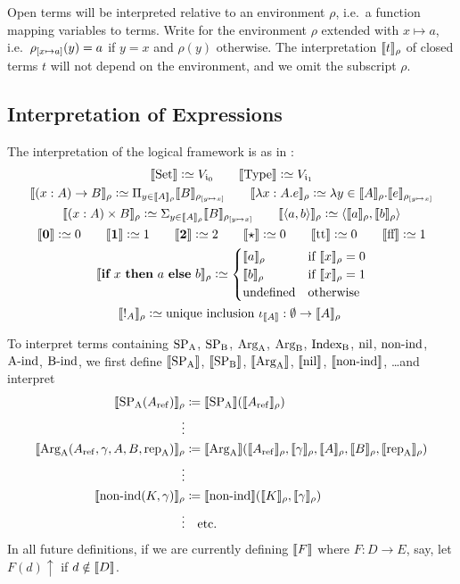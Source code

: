 \documentclass{article}
\begin{document}
Open terms will be interpreted relative to an environment $\rho$, i.e.\ a
function mapping variables to terms. Write  for the
environment $\rho$ extended with $x \mapsto a$, i.e.\ $\rhoextend{x}{a}(y) = a$
if $y = x$ and $\rho(y)$ otherwise. The interpretation $\sem{t}_{\rho}$ of closed
terms $t$ will not depend on the environment, and we omit the subscript $\rho$.

\subsection{Interpretation of Expressions}
\noindent 
The interpretation of the logical framework is as in
\cite{dybjersetzer1999finax}:
\begin{gather*}
\sem{\Set} \colonsimeq V_{\cardz} \qquad \sem{\TYPE} \colonsimeq V_{\cardi} \\
\sem{(x : A) \to B}_\rho \colonsimeq \Pi_{y \in
  \sem{A}_\rho}\sem{B}_{\rhoextend{y}{x}} \qquad
\sem{\lambda x:A.e}_\rho \colonsimeq \lambda y \in
\sem{A}_\rho.\sem{e}_{\rhoextend{y}{x}} \\
\sem{(x : A) \times B}_\rho \colonsimeq \Sigma_{y \in
  \sem{A}_\rho}\sem{B}_{\rhoextend{y}{x}} \qquad
\sem{\langle a, b \rangle}_\rho \colonsimeq \langle \sem{a}_\rho ,
\sem{b}_\rho\rangle \\
\sem{\zero} \colonsimeq 0 \qquad \sem{\one} \colonsimeq 1 \qquad
\sem{\two} \colonsimeq 2 \qquad \sem{\oneelt} \colonsimeq 0 \qquad \sem{\twott} \colonsimeq 0 \qquad
\sem{\twoff} \colonsimeq 1\\
\sem{\IF~x~\THEN~a~\ELSE~b}_\rho \colonsimeq
\begin{cases}
\sem{a}_\rho & \text{if $\sem{x}_\rho = 0$} \\
\sem{b}_\rho & \text{if $\sem{x}_\rho = 1$} \\
\text{undefined} & \text{otherwise} \\
\end{cases} \\
\sem{!_A}_\rho \colonsimeq \text{unique inclusion $\iota_{\sem{A}} : \emptyset \to \sem{A}_\rho$ }
\end{gather*}

To interpret terms containing $\SPA$, $\SPB$, $\ArgA$, $\ArgB$, $\IndexB$, 
$\nilA$, $\nonindA$, $\AindA$, $\BindA$, we first define $\sem{\SPA}$,
$\sem{\SPB}$, $\sem{\ArgA}$, $\sem{\nilA}$, $\sem{\nonindA}$, \ldots and interpret
\begin{align*}
\sem{\SPA(\Aref)}_\rho &\coloneqq \sem{\SPA}(\sem{\Aref}_\rho) \\
\vdots \\
\sem{\ArgA(\Aref, \gamma, A, B, \repA)}_\rho &\coloneqq
\sem{\ArgA}(\sem{\Aref}_\rho, \sem{\gamma}_\rho, \sem{A}_\rho, \sem{B}_\rho, \sem{\repA}_\rho) \\
\vdots \\
\sem{\nonindA(K, \gamma)}_\rho &\coloneqq \sem{\nonindA}(\sem{K}_\rho,
\sem{\gamma}_\rho) \\
\vdots & \text{\quad etc.}
\end{align*}
In all future definitions, if we are currently defining $\sem{F}$ where $F : D
\to E$, say, let $F(d)\uparrow$ if $d \notin \sem{D}$.
\end{document}
